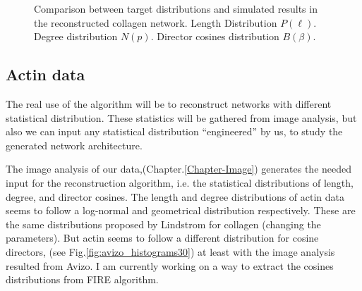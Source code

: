 \begin{figure}[h!]
\begin{minipage}{0.32\textwidth}
\begin{center}
{\label{collagen_degree}}
\end{center}
\end{minipage}
\begin{minipage}{0.32\textwidth}
\begin{center}
\end{center}
\end{minipage}

\caption[Collagen: comparing target and simulated distributions]{ Comparison
between target distributions and simulated results in the reconstructed collagen
network.
 Length Distribution $P(\ell)$.
 Degree distribution $N(p)$.
 Director cosines distribution $B(\beta)$.
}
\label{fig:collagen-distributions}
\end{figure}

\subsection{Actin data}
The real use of the algorithm will be to reconstruct networks with different
statistical distribution. These statistics will be gathered from image analysis,
but also we can input any statistical distribution ``engineered'' by us, to
study the generated network architecture.

The image analysis of our data,(Chapter.\ref{Chapter-Image}) generates the
needed input for the reconstruction algorithm, i.e. the statistical
distributions of length, degree, and director cosines.
The length and degree distributions of actin data seems to follow a log-normal
and geometrical distribution respectively. These are the same distributions
proposed by Lindstrom for collagen (changing the parameters). But actin seems to
follow a different distribution for cosine directors, (see
Fig.\ref{fig:avizo_histograms30}) at least with the image analysis resulted from
Avizo.  I am currently working on a way to extract the cosines distributions from FIRE algorithm.  

